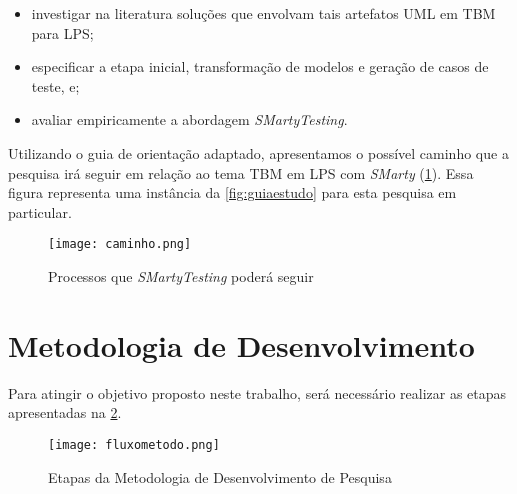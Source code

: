 \begin{itemize}
	\item investigar na literatura soluções que envolvam tais artefatos UML em TBM para LPS;
	\item especificar a etapa inicial, transformação de modelos e geração de casos de teste, e;
	\item avaliar empiricamente a abordagem \textit{SMartyTesting}.
\end{itemize} 

Utilizando o guia de orientação adaptado, apresentamos o possível caminho que a pesquisa irá seguir em relação ao tema TBM em LPS com \textit{SMarty} (\ref{fig:caminho}). Essa figura representa uma instância da \ref{fig:guiaestudo} para esta pesquisa em particular.

\begin{landscape}
	
	\begin{figure}[htb]
		\centering
		\texttt{[image: caminho.png]}
		\caption{Processos que \textit{SMartyTesting} poderá seguir}
		\label{fig:caminho}
	\end{figure}
	
\end{landscape}


\section{Metodologia de Desenvolvimento}
\label{sec:repres_e_fob}

Para atingir o objetivo proposto neste trabalho, será necessário realizar as etapas apresentadas na \ref{fig:fluxometodo}.

	\begin{figure}[htb]
	\centering
	\texttt{[image: fluxometodo.png]}
	\caption{Etapas da Metodologia de Desenvolvimento de Pesquisa}
	\label{fig:fluxometodo}
\end{figure}

